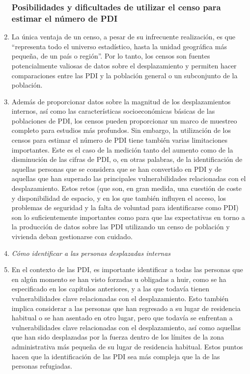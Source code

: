 \documentclass[
]{book}
\begin{document}
\begin{enumerate}
{  \subsubsection{Posibilidades y dificultades de utilizar el censo para estimar el número de PDI}\label{posibilidades-y-dificultades-de-utilizar-el-censo-para-estimar-el-nuxfamero-de-pdi}}
\item
  La única ventaja de un censo, a pesar de su infrecuente realización, es que ``representa todo el universo estadístico, hasta la unidad geográfica más pequeña, de un país o región''. Por lo tanto, los censos son fuentes potencialmente valiosas de datos sobre el desplazamiento y permiten hacer comparaciones entre las PDI y la población general o un subconjunto de la población.
\item
  Además de proporcionar datos sobre la magnitud de los desplazamientos internos, así como las características socioeconómicas básicas de las poblaciones de PDI, los censos pueden proporcionar un marco de muestreo completo para estudios más profundos. Sin embargo, la utilización de los censos para estimar el número de PDI tiene también varias limitaciones importantes. Este es el caso de la medición tanto del aumento como de la disminución de las cifras de PDI, o, en otras palabras, de la identificación de aquellas personas que se considera que se han convertido en PDI y de aquellas que han superado las principales vulnerabilidades relacionadas con el desplazamiento. Estos retos (que son, en gran medida, una cuestión de coste y disponibilidad de espacio, y en los que también influyen el acceso, los problemas de seguridad y la falta de voluntad para identificarse como PDI) son lo suficientemente importantes como para que las expectativas en torno a la producción de datos sobre las PDI utilizando un censo de población y vivienda deban gestionarse con cuidado.
\item
  \emph{Cómo identificar a las personas desplazadas internas}
\item
  En el contexto de las PDI, es importante identificar a todas las personas que en algún momento se han visto forzadas u obligadas a huir, como se ha especificado en los capítulos anteriores, y a las que todavía tienen vulnerabilidades clave relacionadas con el desplazamiento. Esto también implica considerar a las personas que han regresado a su lugar de residencia habitual o se han asentado en otro lugar, pero que todavía se enfrentan a vulnerabilidades clave relacionadas con el desplazamiento, así como aquellas que han sido desplazadas por la fuerza dentro de los límites de la zona administrativa más pequeña de su lugar de residencia habitual. Estos puntos hacen que la identificación de las PDI sea más compleja que la de las personas refugiadas.

\end{enumerate}
\end{document}
